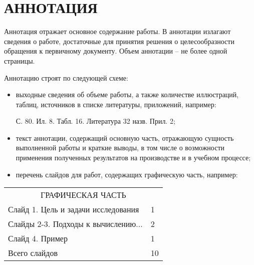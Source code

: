 \newpage
\pagestyle{plain}
\setcounter{page}{3}
\section*{АННОТАЦИЯ}

Аннотация отражает основное содержание работы. В аннотации излагают сведения о работе, достаточные для принятия решения о целесообразности обращения к первичному документу. Объем аннотации -- не более одной страницы.

Аннотацию строят по следующей схеме:
\begin{itemize} 
\item выходные сведения об объеме работы, а также количестве иллюстраций, таблиц, источников в списке литературы, приложений, например:

С. 80. Ил. 8. Табл. 16. Литература 32 назв. Прил. 2;

\item текст аннотации, содержащий основную часть, отражающую сущность выполненной работы и краткие выводы, в том числе о возможности применения полученных результатов на производстве и в учебном процессе;
\item перечень слайдов для работ, содержащих графическую часть, например:
\end{itemize}

\begin{table}[h]

\begin{tabular}{p{14.5cm} p{1cm}}
\multicolumn{2}{c}{ГРАФИЧЕСКАЯ ЧАСТЬ} \\
	Слайд 1. Цель и задачи исследования  & 1 \\
	Слайды 2-3. Подходы к вычислению...  & 2 \\
	Слайд 4. Пример & 1 \\
\hline
	Всего слайдов & 10
\end{tabular}

\end{table} 
